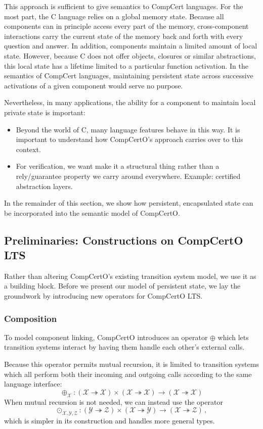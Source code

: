 \documentclass[acmsmall,screen,review,anonymous]{acmart}
\begin{document}
This approach is sufficient to give semantics to CompCert languages.
For the most part, the C language relies on a global memory state.
Because all components can in principle access every part of the memory,
cross-component interactions carry the current state of the memory
back and forth with every question and answer.
In addition,
components maintain a limited amount of local state.
However,
because C does not offer objects, closures or similar abstractions,
this local state has a lifetime limited to a particular function activation.
In the semantics of CompCert languages,
maintaining persistent state across successive activations of a given component
would serve no purpose.

Nevertheless, in many applications,
the ability for a component to maintain local private state
is important:
\begin{itemize}
  \item Beyond the world of C,
    many language features behave in this way.
    It is important to understand how CompCertO's approach
    carries over to this context.
  \item For verification,
    we want make it a structural thing
    rather than a rely/guarantee property we carry around everywhere.
    Example: certified abstraction layers.
\end{itemize}
In the remainder of this section,
we show how persistent, encapsulated state
can be incorporated into
the semantic model of CompCertO.


\subsection{Preliminaries: Constructions on CompCertO LTS} %

Rather than altering CompCertO's existing transition system model,
we use it as a building block.
Before we present our model of persistent state,
we lay the groundwork by introducing new operators
for CompCertO LTS.

\subsubsection{Composition} %

To model component linking,
CompCertO introduces an operator $\oplus$
which lets transition systems interact
by having them handle each other's external calls.

Because this operator permits mutual recursion,
it is limited to transition systems which all perform
both their incoming and outgoing calls
according to the same language interface:
\[
  {\oplus_\mathcal{X}} :
    (\mathcal{X} \twoheadrightarrow \mathcal{X}) \times
    (\mathcal{X} \twoheadrightarrow \mathcal{X}) \rightarrow
    (\mathcal{X} \twoheadrightarrow \mathcal{X})
\]
When mutual recursion is not needed,
we can instead use the operator
\[
  {\odot_{\mathcal{X,Y,Z}} } :
    (\mathcal{Y} \twoheadrightarrow \mathcal{Z}) \times
    (\mathcal{X} \twoheadrightarrow \mathcal{Y}) \rightarrow
    (\mathcal{X} \twoheadrightarrow \mathcal{Z})
  \,,
\]
which is simpler in its construction
and handles more general types.
\end{document}

